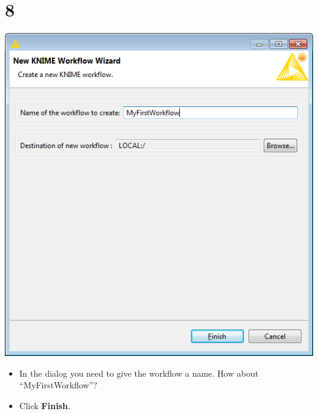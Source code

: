 \documentclass[10pt]{beamer}
\begin{document}
\section{8}
\begin{frame}
	\begin{center}
  		\includegraphics[height=0.6\textheight]{8.png}
	\end{center}
	\begin{itemize}
		\item In the dialog you need to give the workflow a name. How about ``MyFirstWorkflow''?
		\item Click \textbf{Finish}.
	\end{itemize}
\end{frame}
\end{document}
